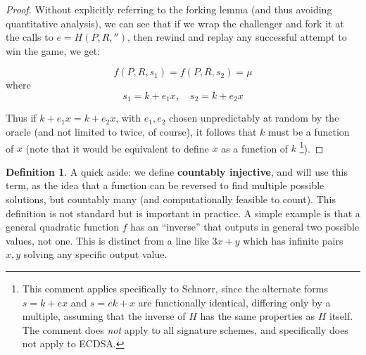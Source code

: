 \documentclass[10pt,a4paper]{article}
\newtheorem{lemma}{Lemma}       %
\theoremstyle{definition}   %
\newtheorem{definition}{Definition}
\theoremstyle{remark}       %
\begin{document}
\begin{proof}
Without explicitly referring to the forking lemma (and thus avoiding quantitative analysis), we can see that if we wrap the challenger and fork it at the calls to $e = H(P, R, '')$, then rewind and replay any successful attempt to win the game, we get:

\[f(P, R, s_1) = f(P, R, s_2) = \mu \]
where
\[s_1 = k + e_1 x, \quad s_2 = k + e_2 x \]

Thus if $k + e_1 x = k + e_2 x$, with $e_1, e_2$ chosen unpredictably at random by the oracle (and not limited to twice, of course), it follows that $k$ must be a function of $x$ (note that it would be equivalent to define $x$ as a function of $k$ \footnote{This comment applies specifically to Schnorr, since the alternate forms $s = k + ex$ and $s = ek + x$ are functionally identical, differing only by a multiple, assuming that the inverse of $H$ has the same properties as $H$ itself. The comment does \emph{not} apply to all signature schemes, and specifically does not apply to ECDSA.}).
\end{proof}

\iffalse
\begin{lemma}[Composite invertibility]
\label{lem:compinver}
Let \( g : A \to B \) and \( h : B \to C \) be functions, and define \( f = h \circ g : A \to C \).
If \( f \) and \( g \) are invertible, then \( h \) is also invertible, with
\[
    h^{-1} = g \circ f^{-1}.
\]
\end{lemma}

\begin{proof}
Since \( f = h \circ g \), we have \( h = f \circ g^{-1} \).
Because both \( f \) and \( g^{-1} \) are bijective, their composition \( h \) is bijective as well.
Thus \( h \) is invertible, and its inverse is given by \( h^{-1} = g \circ f^{-1} \).
\end{proof}
\fi

\begin{definition}
A quick aside: we define \textbf{countably injective}, and will use this term, as the idea that a function can be reversed to find multiple possible solutions, but countably many (and computationally feasible to count). This definition is not standard but is important in practice. A simple example is that a general quadratic function $f$ has an ``inverse'' that outputs in general two possible values, not one. This is distinct from a line like $3x+y$ which has infinite pairs $x, y$ solving any specific output value.
\end{definition}
\end{document}
